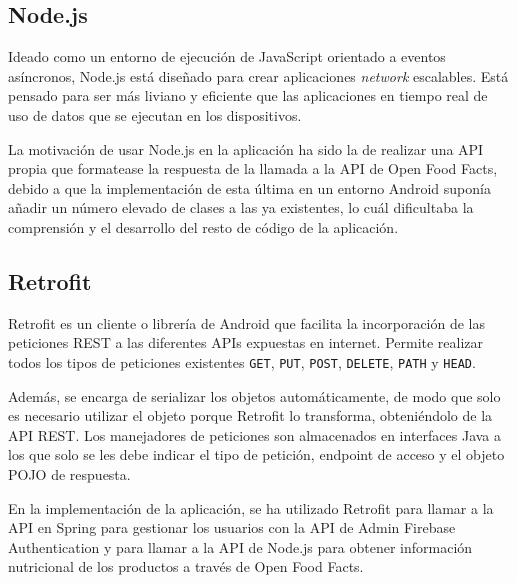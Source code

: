 \subsection{Node.js}
Ideado como un entorno de ejecución de JavaScript orientado a eventos asíncronos, Node.js \cite{nodejs} está diseñado para crear aplicaciones \textit{network} escalables. Está pensado para ser más liviano y eficiente que las aplicaciones en tiempo real de uso de datos que se ejecutan en los dispositivos.

La motivación de usar Node.js en la aplicación ha sido la de realizar una API propia que formatease la respuesta de la llamada a la API de Open Food Facts, debido a que la implementación de esta última en un entorno Android \cite{open_food_facts_android} suponía añadir un número elevado de clases a las ya existentes, lo cuál dificultaba la comprensión y el desarrollo del resto de código de la aplicación.

\subsection{Retrofit}
Retrofit \cite{retrofit} es un cliente o librería de Android que facilita la incorporación de las peticiones REST a las diferentes APIs expuestas en internet. Permite realizar todos los tipos de peticiones existentes \texttt{GET}, \texttt{PUT}, \texttt{POST}, \texttt{DELETE}, \texttt{PATH} y \texttt{HEAD}.

Además, se encarga de serializar los objetos automáticamente, de modo que solo es necesario utilizar el objeto porque Retrofit lo transforma, obteniéndolo de la API REST. Los manejadores de peticiones son almacenados en interfaces Java a los que solo se les debe indicar el tipo de petición, endpoint de acceso y el objeto POJO de respuesta.

En la implementación de la aplicación, se ha utilizado Retrofit para llamar a la API en Spring para gestionar los usuarios con la API de Admin Firebase Authentication y para llamar a la API de Node.js para obtener información nutricional de los productos a través de Open Food Facts.